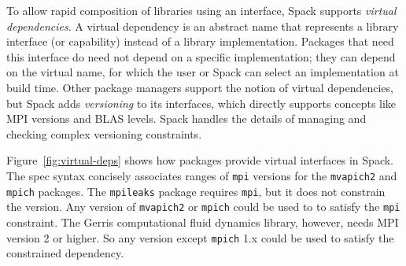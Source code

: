 To allow rapid composition of libraries using an interface, Spack supports
{\it virtual dependencies}.  A virtual dependency is an abstract name that
represents a library interface (or capability) instead of a library
implementation.  Packages that need this interface do need not depend on
a specific implementation; they can depend on the virtual name, for which
the user or Spack can select an implementation at build time.
Other package managers support the notion of virtual dependencies, but Spack
adds {\it versioning} to its interfaces, which directly supports concepts 
like MPI versions and BLAS levels.  Spack
handles the details of managing and checking complex versioning constraints.

Figure~\ref{fig:virtual-deps} shows how packages provide
virtual interfaces in Spack.  The spec syntax concisely associates ranges 
of {\tt mpi} versions for the {\tt mvapich2} and {\tt mpich} packages.
The {\tt mpileaks} package requires {\tt mpi}, but it does not constrain the version.
Any version of {\tt mvapich2} or {\tt mpich} could be used to to satisfy the {\tt mpi}
constraint. The Gerris computational fluid dynamics library, however, needs MPI version 2 or higher.  So any
version except {\tt mpich} 1.x could be used to satisfy the constrained dependency.


